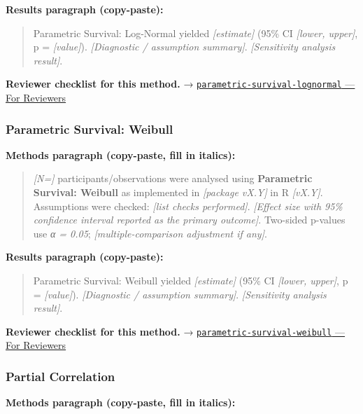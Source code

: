 \documentclass[
]{article}
\begin{document}
\textbf{Results paragraph (copy-paste):}

\begin{quote}
Parametric Survival: Log-Normal yielded \emph{{[}estimate{]}} (95\% CI
\emph{{[}lower, upper{]}}, p = \emph{{[}value{]}}). \emph{{[}Diagnostic
/ assumption summary{]}}. \emph{{[}Sensitivity analysis result{]}}.
\end{quote}

\textbf{Reviewer checklist for this method.} →
\href{../chapters/11-survival/parametric-survival-lognormal.Rmd\#for-reviewers}{\texttt{parametric-survival-lognormal}
--- For Reviewers}

\subsubsection{Parametric Survival:
Weibull}\label{parametric-survival-weibull}

\textbf{Methods paragraph (copy-paste, fill in italics):}

\begin{quote}
\emph{{[}N={]}} participants/observations were analysed using
\textbf{Parametric Survival: Weibull} as implemented in \emph{{[}package
vX.Y{]}} in R \emph{{[}vX.Y{]}}. Assumptions were checked: \emph{{[}list
checks performed{]}}. \emph{{[}Effect size with 95\% confidence interval
reported as the primary outcome{]}}. Two-sided p-values use \emph{α =
0.05}; \emph{{[}multiple-comparison adjustment if any{]}}.
\end{quote}

\textbf{Results paragraph (copy-paste):}

\begin{quote}
Parametric Survival: Weibull yielded \emph{{[}estimate{]}} (95\% CI
\emph{{[}lower, upper{]}}, p = \emph{{[}value{]}}). \emph{{[}Diagnostic
/ assumption summary{]}}. \emph{{[}Sensitivity analysis result{]}}.
\end{quote}

\textbf{Reviewer checklist for this method.} →
\href{../chapters/11-survival/parametric-survival-weibull.Rmd\#for-reviewers}{\texttt{parametric-survival-weibull}
--- For Reviewers}

\subsubsection{Partial Correlation}\label{partial-correlation}

\textbf{Methods paragraph (copy-paste, fill in italics):}
\end{document}
